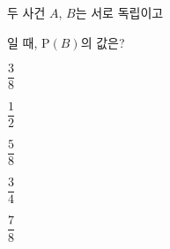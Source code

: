 두 사건 $A$, $B$는 서로 독립이고 \par\smallskip{}\par\smallskip\noindent 일 때, $\mathrm{P}(B)$의 값은? 
\begin{choices32}{\rule[-3ex]{0pt}{8ex}$\dfrac{3}{8}$}{\rule[-3ex]{0pt}{8ex}$\dfrac{1}{2}$}{\rule[-3ex]{0pt}{8ex}$\dfrac{5}{8}$}{\rule[-3ex]{0pt}{8ex}$\dfrac{3}{4}$}{\rule[-3ex]{0pt}{8ex}$\dfrac{7}{8}$}\end{choices32}
